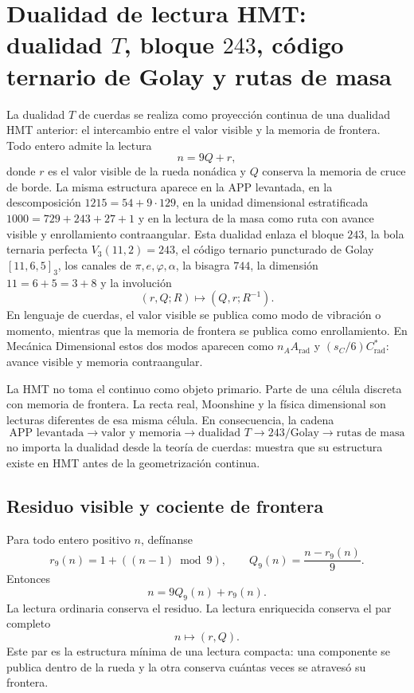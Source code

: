\section{Dualidad de lectura HMT: dualidad \texorpdfstring{\(T\)}{T}, bloque \texorpdfstring{\(243\)}{243}, código ternario de Golay y rutas de masa}
\label{sec:sucesor83-f083-dualidad-t}

La dualidad \(T\) de cuerdas se realiza como proyección continua de una
dualidad HMT anterior: el intercambio entre el valor visible y la memoria de
frontera. Todo entero admite la lectura
\[
n=9Q+r,
\]
donde \(r\) es el valor visible de la rueda nonádica y \(Q\) conserva la
memoria de cruce de borde. La misma estructura aparece en la APP levantada,
en la descomposición \(1215=54+9\cdot129\), en la unidad dimensional
estratificada \(1000=729+243+27+1\) y en la lectura de la masa como ruta con
avance visible y enrollamiento contraangular. Esta dualidad enlaza el bloque
\(243\), la bola ternaria perfecta \(V_3(11,2)=243\), el código ternario
puncturado de Golay \([11,6,5]_3\), los canales de
\(\pi,e,\varphi,\alpha\), la bisagra \(744\), la dimensión
\(11=6+5=3+8\) y la involución
\[
(r,Q;R)\longmapsto(Q,r;R^{-1}).
\]
En lenguaje de cuerdas, el valor visible se publica como modo de vibración o
momento, mientras que la memoria de frontera se publica como enrollamiento.
En Mecánica Dimensional estos dos modos aparecen como
\(n_AA_{\mathrm{rad}}\) y \((s_C/6)C^*_{\mathrm{rad}}\): avance visible y
memoria contraangular.

La HMT no toma el continuo como objeto primario. Parte de una célula discreta
con memoria de frontera. La recta real, Moonshine y la física dimensional son
lecturas diferentes de esa misma célula. En consecuencia, la cadena
\[
\text{APP levantada}
\longrightarrow\text{valor y memoria}
\longrightarrow\text{dualidad }T
\longrightarrow243/\text{Golay}
\longrightarrow\text{rutas de masa}
\]
no importa la dualidad desde la teoría de cuerdas: muestra que su estructura
existe en HMT antes de la geometrización continua.

\subsection{Residuo visible y cociente de frontera}

Para todo entero positivo \(n\), defínanse
\[
r_9(n)=1+((n-1)\bmod 9),
\qquad
Q_9(n)=\frac{n-r_9(n)}{9}.
\]
Entonces
\[
n=9Q_9(n)+r_9(n).
\]
La lectura ordinaria conserva el residuo. La lectura enriquecida conserva el
par completo
\[
n\longmapsto(r,Q).
\]
Este par es la estructura mínima de una lectura compacta: una componente se
publica dentro de la rueda y la otra conserva cuántas veces se atravesó su
frontera.

